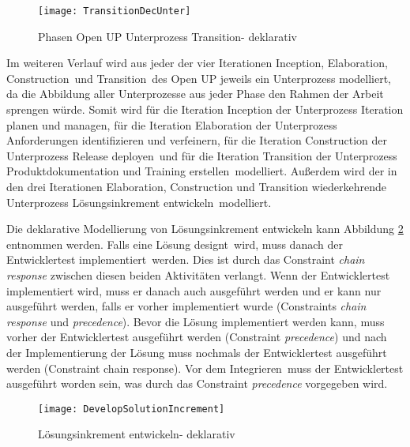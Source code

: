 \begin{figure}[htp]
\begin{center}
  \texttt{[image: TransitionDecUnter]} %
  \caption{Phasen Open UP Unterprozess Transition- deklarativ}
  \label{fig:TransitionDecUnter}
\end{center}
\end{figure}



Im weiteren Verlauf wird aus jeder der vier Iterationen \grqq Inception\grqq , \grqq Elaboration\grqq, \grqq Construction\grqq \  und \grqq Transition\grqq \  des Open UP jeweils ein Unterprozess modelliert, da die Abbildung aller Unterprozesse aus jeder Phase den Rahmen der Arbeit sprengen würde. \newline
Somit wird für die Iteration Inception der Unterprozess \grqq Iteration planen und managen\grqq, für die Iteration Elaboration der Unterprozess \grqq Anforderungen identifizieren und verfeinern\grqq, für die Iteration Construction der Unterprozess \grqq Release deployen\grqq \  und für die Iteration Transition der Unterprozess \grqq Produktdokumentation und Training erstellen\grqq \  modelliert. Außerdem wird der in den drei Iterationen Elaboration, Construction und Transition wiederkehrende Unterprozess \grqq Lösungsinkrement entwickeln\grqq \  modelliert.


Die deklarative Modellierung von Lösungsinkrement entwickeln kann Abbildung \ref{fig:Develop} entnommen werden.\newline
Falls eine \grqq Lösung designt\grqq \ wird, muss danach der \grqq Entwicklertest implementiert\grqq \ werden. Dies ist durch das Constraint \textit{chain response} zwischen diesen beiden Aktivitäten verlangt. Wenn der Entwicklertest implementiert wird, muss er danach auch ausgeführt werden und er kann nur ausgeführt werden, falls er vorher implementiert wurde (Constraints \textit{chain response} und \textit{precedence}).\newline
Bevor die Lösung implementiert werden kann, muss vorher der Entwicklertest ausgeführt werden (Constraint \textit{precedence}) und nach der Implementierung der Lösung muss nochmals der Entwicklertest ausgeführt werden (Constraint chain response).\newline
Vor dem \grqq Integrieren\grqq \ muss der Entwicklertest ausgeführt worden sein, was durch das Constraint \textit{precedence} vorgegeben wird.
\begin{figure}[htp]
\begin{center}
  \texttt{[image: DevelopSolutionIncrement]} %
  \caption{Lösungsinkrement entwickeln- deklarativ}
  \label{fig:Develop}
\end{center}
\end{figure}


